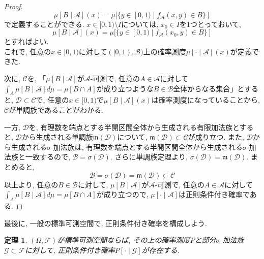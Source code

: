 \documentclass[a4paper,12pt]{jsarticle}
\theoremstyle{break}
\newtheorem{theorem}{定理}
\begin{document}
\begin{proof}
\begin{equation*}
\mu[B\mid\mathcal{A}](x)=\mu[\{y\in[0,1)\mid f_\mathcal{A}(x,y)\in B\}]
\end{equation*}
で定義することができる. $x\in [0,1)\setminus I$については, $x_0\in I$を1つとっておいて, 
\begin{equation*}
\mu[B\mid\mathcal{A}](x)=\mu[\{y\in[0,1) \mid f_\mathcal{A}(x_0,y)\in B\}]
\end{equation*}
とすればよい.\\
これで, 任意の$x\in[0,1)$に対して$([0,1),\mathcal{B})$上の確率測度$\mu[\cdot\mid\mathcal{A}](x)$が定義できた.
\par 次に, $\mathcal{C}$を, 「$\mu[B\mid\mathcal{A}]$が$\mathcal{A}$-可測で, 任意の$A\in\mathcal{A}$に対して$\int_A \mu[B\mid\mathcal{A}] d\mu =\mu[B\cap A]$が成り立つような$B\in\mathcal{B}$全体からなる集合」とすると, $\mathcal{D}\subset\mathcal{C}$で, 
任意の$x\in[0,1)$で$\mu[B\mid\mathcal{A}](x)$は確率測度になっていることから, $\mathcal{C}$が単調族であることがわかる. 
\par 一方, $\mathcal{D}$を, 有理数を端点とする半開区間全体から生成される有限加法族とすると, $\mathcal{D}$から生成される単調族$\mathfrak{m}(\mathcal{D})$について, 
$\mathfrak{m}(\mathcal{D})\subset \mathcal{C}$が成り立つ. また, $\mathcal{D}$から生成される$\sigma$-加法族は, 
有理数を端点とする半開区間全体から生成される$\sigma$-加法族と一致するので, $\mathcal{B}=\sigma(\mathcal{D})$. さらに単調族定理より, $\sigma(\mathcal{D})=\mathfrak{m}(\mathcal{D})$. まとめると, 
\begin{equation*}
\mathcal{B}=\sigma(\mathcal{D})=\mathfrak{m}(\mathcal{D})\subset \mathcal{C}
\end{equation*}
以上より, 任意の$B\in\mathcal{B}$に対して, $\mu[B\mid\mathcal{A}]$が$\mathcal{A}$-可測で, 任意の$A\in\mathcal{A}$に対して$\int_A \mu[B\mid\mathcal{A}] d\mu =\mu[B\cap A]$が成り立つので, $\mu[\cdot\mid\mathcal{A}]$は正則条件付き確率である.
\end{proof}

最後に, 一般の標準可測空間で, 正則条件付き確率を構成しよう.

\begin{theorem}
$(\Omega,\mathcal{F})$が標準可測空間ならば, その上の確率測度$P$と部分$\sigma$-加法族$\mathcal{G}\subset\mathcal{F}$に対して, 正則条件付き確率$P[\cdot\mid\mathcal{G}]$が存在する.
\end{theorem}
\end{document}
